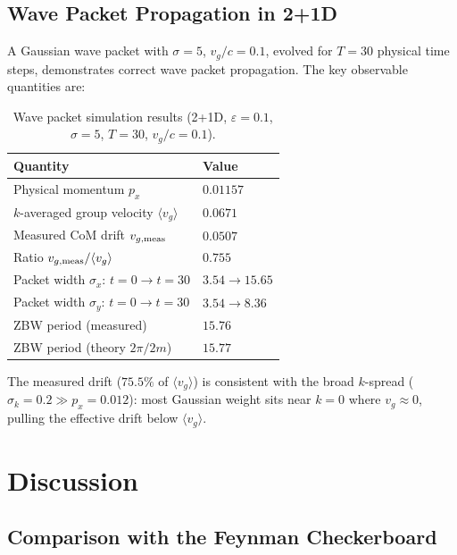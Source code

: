 \documentclass[twocolumn,showpacs,preprintnumbers,amsmath,amssymb]{revtex4-2}
\newcommand{\eps}{\varepsilon}
\newcommand{\avg}[1]{\langle #1 \rangle}
\begin{document}
\subsection{Wave Packet Propagation in 2+1D}

A Gaussian wave packet with $\sigma = 5$, $v_g/c = 0.1$, evolved for $T = 30$
physical time steps, demonstrates correct wave packet propagation.
The key observable quantities are:

\begin{table}[h]
\caption{Wave packet simulation results (2+1D, $\eps=0.1$, $\sigma=5$,
$T=30$, $v_g/c=0.1$).}
\label{tab:wavepacket}
\begin{ruledtabular}
\begin{tabular}{ll}
Quantity & Value \\
\hline
Physical momentum $p_x$ & $0.01157$ \\
$k$-averaged group velocity $\avg{v_g}$ & $0.0671$ \\
Measured CoM drift $v_{g,\rm meas}$ & $0.0507$ \\
Ratio $v_{g,\rm meas}/\avg{v_g}$ & $0.755$ \\
Packet width $\sigma_x$: $t{=}0 \to t{=}30$ & $3.54 \to 15.65$ \\
Packet width $\sigma_y$: $t{=}0 \to t{=}30$ & $3.54 \to 8.36$ \\
ZBW period (measured) & $15.76$ \\
ZBW period (theory $2\pi/2m$) & $15.77$ \\
\end{tabular}
\end{ruledtabular}
\end{table}

The measured drift ($75.5\%$ of $\avg{v_g}$) is consistent with the broad
$k$-spread ($\sigma_k = 0.2 \gg p_x = 0.012$): most Gaussian weight sits near
$k = 0$ where $v_g \approx 0$, pulling the effective drift below $\avg{v_g}$.


\section{Discussion}
\label{sec:discussion}

\subsection{Comparison with the Feynman Checkerboard}
\end{document}
